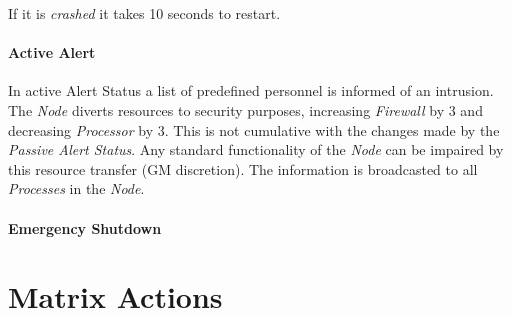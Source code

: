 If it is \emph{crashed} it takes 10 seconds to restart.

\paragraph{Active Alert}

In active Alert Status a list of predefined personnel is informed of an intrusion.
The \emph{Node} diverts resources to security purposes, increasing \emph{Firewall}
by 3 and decreasing \emph{Processor} by 3. This is not cumulative with the changes made
by the \emph{Passive Alert Status}. Any standard functionality of the \emph{Node} can
be impaired by this resource transfer (GM discretion).
The information is broadcasted to all \emph{Processes} in the \emph{Node}.

\paragraph{Emergency Shutdown}

\section{Matrix Actions}

